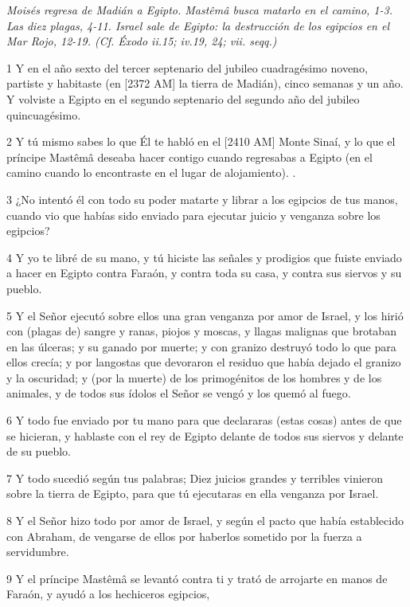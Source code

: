 \par \textit{Moisés regresa de Madián a Egipto. Mastêmâ busca matarlo en el camino, 1-3. Las diez plagas, 4-11. Israel sale de Egipto: la destrucción de los egipcios en el Mar Rojo, 12-19. (Cf. Éxodo ii.15; iv.19, 24; vii. seqq.)}

\par 1 Y en el año sexto del tercer septenario del jubileo cuadragésimo noveno, partiste y habitaste (en [2372 AM] la tierra de Madián), cinco semanas y un año. Y volviste a Egipto en el segundo septenario del segundo año del jubileo quincuagésimo.
\par 2 Y tú mismo sabes lo que Él te habló en el [2410 AM] Monte Sinaí, y lo que el príncipe Mastêmâ deseaba hacer contigo cuando regresabas a Egipto (en el camino cuando lo encontraste en el lugar de alojamiento). .
\par 3 ¿No intentó él con todo su poder matarte y librar a los egipcios de tus manos, cuando vio que habías sido enviado para ejecutar juicio y venganza sobre los egipcios?
\par 4 Y yo te libré de su mano, y tú hiciste las señales y prodigios que fuiste enviado a hacer en Egipto contra Faraón, y contra toda su casa, y contra sus siervos y su pueblo.
\par 5 Y el Señor ejecutó sobre ellos una gran venganza por amor de Israel, y los hirió con (plagas de) sangre y ranas, piojos y moscas, y llagas malignas que brotaban en las úlceras; y su ganado por muerte; y con granizo destruyó todo lo que para ellos crecía; y por langostas que devoraron el residuo que había dejado el granizo y la oscuridad; y (por la muerte) de los primogénitos de los hombres y de los animales, y de todos sus ídolos el Señor se vengó y los quemó al fuego.
\par 6 Y todo fue enviado por tu mano para que declararas (estas cosas) antes de que se hicieran, y hablaste con el rey de Egipto delante de todos sus siervos y delante de su pueblo.
\par 7 Y todo sucedió según tus palabras; Diez juicios grandes y terribles vinieron sobre la tierra de Egipto, para que tú ejecutaras en ella venganza por Israel.
\par 8 Y el Señor hizo todo por amor de Israel, y según el pacto que había establecido con Abraham, de vengarse de ellos por haberlos sometido por la fuerza a servidumbre.
\par 9 Y el príncipe Mastêmâ se levantó contra ti y trató de arrojarte en manos de Faraón, y ayudó a los hechiceros egipcios,
